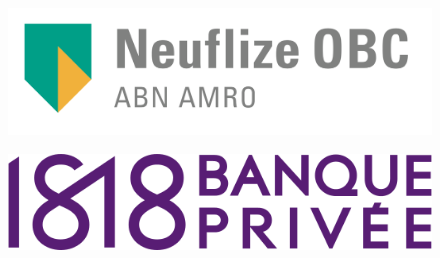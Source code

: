 \begin{figure}[h]
	\includegraphics[scale=0.5]{images/neuflizeOBCLogo.png}
	\centering
	\label{neuflizeOBCLogo}
\end{figure}

\begin{figure}[h]
	\includegraphics[scale=0.5]{images/bp1818Logo.png}
	\centering
	\label{bp1818Logo}
\end{figure}
		
		